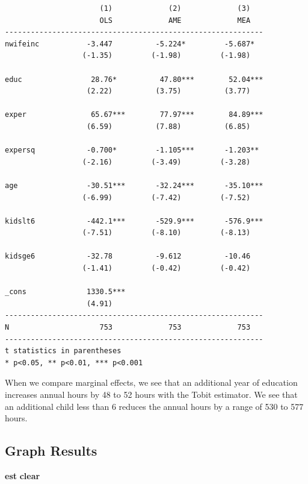 \documentclass[
]{book}
\newenvironment{Shaded}{\begin{snugshade}}{\end{snugshade}}
\newcommand{\KeywordTok}[1]{\textcolor[rgb]{0.13,0.29,0.53}{\textbf{#1}}}
\begin{document}
\begin{verbatim}
                      (1)             (2)             (3)   
                      OLS             AME             MEA   
------------------------------------------------------------
nwifeinc           -3.447          -5.224*         -5.687*  
                  (-1.35)         (-1.98)         (-1.98)   

educ                28.76*          47.80***        52.04***
                   (2.22)          (3.75)          (3.77)   

exper               65.67***        77.97***        84.89***
                   (6.59)          (7.88)          (6.85)   

expersq            -0.700*         -1.105***       -1.203** 
                  (-2.16)         (-3.49)         (-3.28)   

age                -30.51***       -32.24***       -35.10***
                  (-6.99)         (-7.42)         (-7.52)   

kidslt6            -442.1***       -529.9***       -576.9***
                  (-7.51)         (-8.10)         (-8.13)   

kidsge6            -32.78          -9.612          -10.46   
                  (-1.41)         (-0.42)         (-0.42)   

_cons              1330.5***                                
                   (4.91)                                   
------------------------------------------------------------
N                     753             753             753   
------------------------------------------------------------
t statistics in parentheses
* p<0.05, ** p<0.01, *** p<0.001
\end{verbatim}

When we compare marginal effects, we see that an additional year of education increases annual hours by 48 to 52 hours with the Tobit estimator. We see that an additional child less than 6 reduces the annual hours by a range of 530 to 577 hours.

\subsection*{Graph Results}\label{graph-results}

\begin{Shaded}
\begin{Highlighting}[]
\KeywordTok{est} \KeywordTok{clear}
\end{Highlighting}
\end{Shaded}
\end{document}
